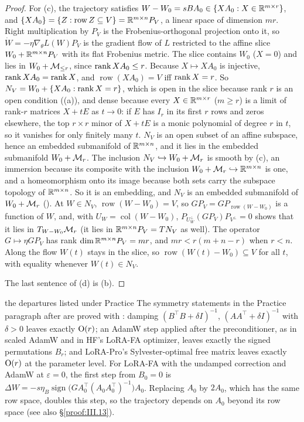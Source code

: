 \begin{proof}
For (c), the trajectory satisfies $W-W_0=sBA_0\in\{XA_0:X\in\mathbb{R}^{m\times r}\}$, and $\{XA_0\}=\{Z:\operatorname{row}Z\subseteq V\}=\mathbb{R}^{m\times n}P_V$,
a linear space of dimension $mr$. Right multiplication by $P_V$ is the Frobenius-orthogonal projection onto it, so
$\dot W=-\eta\nabla_\theta L(W)P_V$ is the gradient flow of $L$ restricted to the affine slice $W_0+\mathbb{R}^{m\times n}P_V$
with its flat Frobenius metric. The slice contains $W_0$ ($X=0$) and lies in $W_0+\mathcal{M}_{\le r}$, since $\operatorname{rank} XA_0\le r$. Because
$X\mapsto XA_0$ is injective, $\operatorname{rank} XA_0=\operatorname{rank} X$, and $\operatorname{row}(XA_0)=V$ iff $\operatorname{rank} X=r$. So
$N_V=W_0+\{XA_0:\operatorname{rank} X=r\}$, which is open in the slice because rank $r$ is an open condition ((a)), and
dense because every $X\in\mathbb{R}^{m\times r}$ ($m\ge r$) is a limit of rank-$r$ matrices $X+tE$ as $t\to0$: if $E$ has
$I_r$ in its first $r$ rows and zeros elsewhere, the top $r\times r$ minor of $X+tE$ is a monic polynomial of degree $r$
in $t$, so it vanishes for only finitely many $t$. $N_V$ is an open
subset of an affine subspace, hence an embedded submanifold of $\mathbb{R}^{m\times n}$, and it lies in the embedded
submanifold $W_0+\mathcal{M}_r$. The inclusion $N_V\hookrightarrow W_0+\mathcal{M}_r$ is smooth by (c), an immersion
because its composite with the inclusion $W_0+\mathcal{M}_r\hookrightarrow\mathbb{R}^{m\times n}$ is one, and a homeomorphism onto its
image because both sets carry the subspace topology of $\mathbb{R}^{m\times n}$. So it is an embedding, and $N_V$ is an embedded
submanifold of $W_0+\mathcal{M}_r$ (). At $W\in N_V$, $\operatorname{row}(W-W_0)=V$, so $GP_V=GP_{\operatorname{row}(W-W_0)}$ is a
function of $W$, and, with $U_W=\operatorname{col}(W-W_0)$, $P_{U_W^\perp}(GP_V)P_{V^\perp}=0$ shows that it lies in $T_{W-W_0}\mathcal{M}_r$ (it lies in
$\mathbb{R}^{m\times n}P_V=T N_V$ as well). The operator $G\mapsto\eta GP_V$ has rank $\dim\mathbb{R}^{m\times n}P_V=mr$, and
$mr<r(m+n-r)$ when $r<n$. Along the flow $W(t)$ stays in the slice, so $\operatorname{row}(W(t)-W_0)\subseteq V$ for
all $t$, with equality whenever $W(t)\in N_V$.

The last sentence of (d) is (b).
\end{proof}

\begin{remark*}{the departures listed under Practice}
The symmetry statements in the Practice paragraph after  are proved with
: damping $(B^\top B+\delta I)^{-1}$, $(AA^\top+\delta I)^{-1}$ with $\delta>0$ leaves exactly
$\mathrm{O}(r)$; an AdamW step applied after the preconditioner, as in scaled AdamW and in HF's LoRA-FA optimizer, leaves
exactly the signed permutations $B_r$; and LoRA-Pro's Sylvester-optimal free matrix leaves exactly $\mathrm{O}(r)$ at the
parameter level. For LoRA-FA with the undamped correction and AdamW at $\varepsilon=0$, the first step from $B_0=0$ is
$\Delta W=-s\eta_B\operatorname{sign}\big(GA_0^\top(A_0A_0^\top)^{-1}\big)A_0$. Replacing $A_0$ by $2A_0$, which has the
same row space, doubles this step, so the trajectory depends on $A_0$ beyond its row space (see also
\S\ref{proof:III.13}).
\end{remark*}

